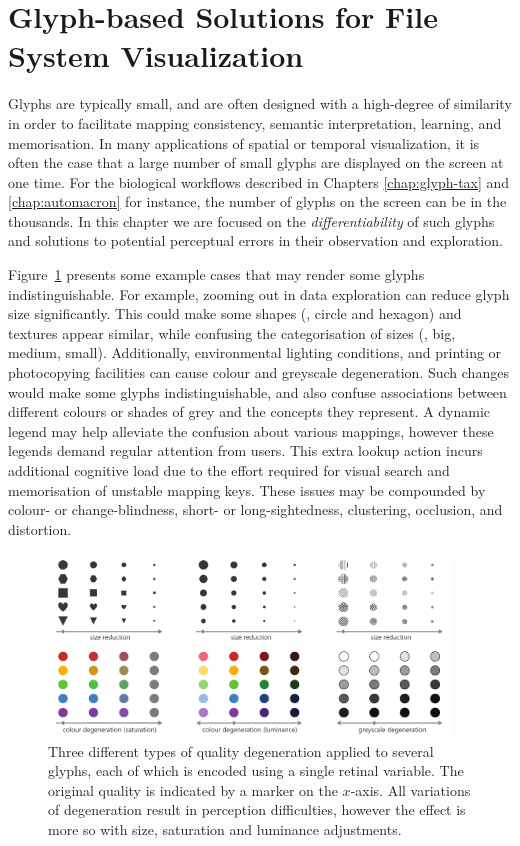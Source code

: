 \section{Glyph-based Solutions for File System Visualization}
\label{sec:file_system}
Glyphs are typically small, and are often designed with a high-degree of similarity in order to facilitate mapping consistency, semantic interpretation, learning, and memorisation.
In many applications of spatial or temporal visualization, it is often the case that a large number of small glyphs are displayed on the screen at one time.
For the biological workflows described in Chapters \ref{chap:glyph-tax} and \ref{chap:automacron} for instance, the number of glyphs on the screen can be in the thousands.
In this chapter we are focused on the \emph{differentiability} of such glyphs and solutions to potential perceptual errors in their observation and exploration.

Figure~\ref{fig:reduction_degradation} presents some example cases that may render some glyphs indistinguishable. 
For example, zooming out in data exploration can reduce glyph size significantly.
This could make some shapes (\eg, circle and hexagon) and textures appear similar, while confusing the categorisation of sizes (\eg, big, medium, small).
Additionally, environmental lighting conditions, and printing or photocopying facilities can cause colour and greyscale degeneration.
Such changes would make some glyphs indistinguishable, and also confuse associations between different colours or shades of grey and the concepts they represent.
A dynamic legend may help alleviate the confusion about various mappings, however these legends demand regular attention from users.
This extra lookup action incurs additional cognitive load due to the effort required for visual search and memorisation of unstable mapping keys.
These issues may be compounded by colour- or change-blindness, short- or long-sightedness, clustering, occlusion, and distortion.

\begin{figure}[t]
\begin{center}
\includegraphics[width=0.95\textwidth]{images/filesystem/Unsafe}
\end{center}
\caption{Three different types of quality degeneration applied to several glyphs, each of which is encoded using a single retinal variable.
The original quality is indicated by a marker on the $x$-axis.
All variations of degeneration result in perception difficulties, however the effect is more so with size, saturation and luminance adjustments.}
\label{fig:reduction_degradation}
\end{figure} 


